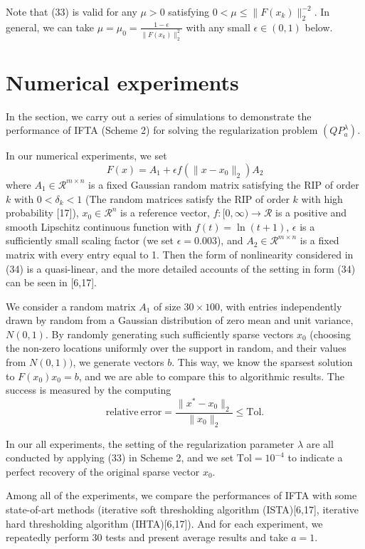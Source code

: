 \documentclass[smallextended]{svjour3}
\begin{document}
Note that (33) is valid for any $\mu>0$ satisfying $0<\mu\leq\|F(x_{k})\|_{2}^{-2}$. In general, we can take $\mu=\mu_{0}=\frac{1-\epsilon}{\|F(x_{k})\|_{2}^{2}}$
with any small $\epsilon\in(0,1)$ below.

\section{Numerical experiments} \label{applications-sec}
In the section, we carry out a series of simulations to demonstrate the performance of IFTA (Scheme 2) for solving the regularization
problem $(QP_{a}^{\lambda})$.

In our numerical experiments, we set
\begin{equation}\label{34}
F(x)=A_{1}+\epsilon f(\|x-x_{0}\|_{2}) A_{2}
\end{equation}
where $A_{1}\in\mathcal{R}^{m\times n}$ is a fixed Gaussian random matrix satisfying the RIP of order $k$ with $0<\delta_{k}<1$
(The random matrices satisfy the RIP of order $k$ with high probability [17]), $x_{0}\in \mathcal{R}^{n}$ is a reference vector,
$f:[0,\infty)\rightarrow \mathcal{R}$ is a positive and smooth Lipschitz continuous function with $f(t)=\ln(t+1)$, $\epsilon$ is
a sufficiently small scaling factor (we set $\epsilon=0.003$), and $A_{2}\in \mathcal{R}^{m\times n}$ is a fixed matrix with
every entry equal to 1. Then the form of nonlinearity considered in (34) is a quasi-linear, and the more detailed accounts of
the setting in form (34) can be seen in [6,17].

We consider a random matrix $A_{1}$ of size $30\times100$, with entries independently drawn by random from a Gaussian distribution of zero
mean and unit variance, $N(0, 1)$. By randomly generating such sufficiently sparse vectors $x_{0}$ (choosing the non-zero locations
uniformly over the support in random, and their values from $N(0,1))$, we generate vectors $b$. This way, we know the sparsest solution
to $F(x_{0})x_{0} = b$, and we are able to compare this to algorithmic results. The success is measured by the computing
$$\mathrm{relative\ error}=\frac{\|x^{\ast}-x_{0}\|_{2}}{\|x_{0}\|_{2}}\leq \mathrm{Tol}.$$

In our all experiments, the setting of the regularization parameter $\lambda$ are all conducted by applying (33) in Scheme 2, and we set
$\mathrm{Tol}=10^{-4}$ to indicate a perfect recovery of the original sparse vector $x_{0}$.

Among all of the experiments, we compare the performances of IFTA with some state-of-art methods (iterative soft thresholding algorithm (ISTA)[6,17],
iterative hard thresholding algorithm (IHTA)[6,17]). And for each experiment, we repeatedly perform 30 tests and present average results and take $a=1$.
\end{document}
